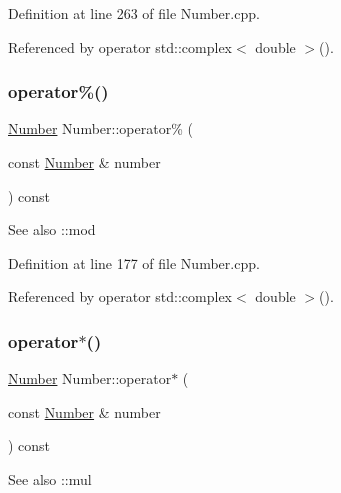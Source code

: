 Definition at line 263 of file Number.\+cpp.



Referenced by operator std\+::complex$<$ double $>$().

\mbox{\label{classteam22_1_1_math_1_1_number_af635db4c3ad5c6818213472478a9a340}} 
\subsubsection{\texorpdfstring{operator\%()}{operator\%()}}
{\footnotesize\ttfamily \hyperlink{classteam22_1_1_math_1_1_number}{Number} Number\+::operator\% (\begin{DoxyParamCaption}\item[{const \hyperlink{classteam22_1_1_math_1_1_number}{Number} \&}]{number }\end{DoxyParamCaption}) const}

\begin{DoxySeeAlso}{See also}
\+::mod 
\end{DoxySeeAlso}


Definition at line 177 of file Number.\+cpp.



Referenced by operator std\+::complex$<$ double $>$().

\mbox{\label{classteam22_1_1_math_1_1_number_a0d0b4f119988b15a9b62f0886b3cf663}} 
\subsubsection{\texorpdfstring{operator$\ast$()}{operator*()}}
{\footnotesize\ttfamily \hyperlink{classteam22_1_1_math_1_1_number}{Number} Number\+::operator$\ast$ (\begin{DoxyParamCaption}\item[{const \hyperlink{classteam22_1_1_math_1_1_number}{Number} \&}]{number }\end{DoxyParamCaption}) const}

\begin{DoxySeeAlso}{See also}
\+::mul 
\end{DoxySeeAlso}


